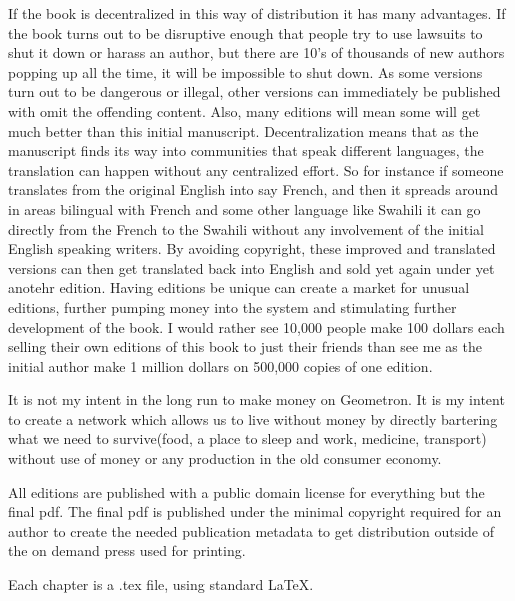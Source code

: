 If the book is decentralized in this way of distribution it has many advantages.  If the book turns out to be disruptive enough that people try to use lawsuits to shut it down or harass an author, but there are 10's of thousands of new authors popping up all the time, it will be impossible to shut down. As some versions turn out to be dangerous or illegal, other versions can immediately be published with omit the offending content. Also, many editions will mean some will get much better than this initial manuscript.  Decentralization means that as the manuscript finds its way into communities that speak different languages, the translation can happen without any centralized effort. So for instance if someone translates from the original English into say French, and then it spreads around in areas bilingual with French and some other language like Swahili it can go directly from the French to the Swahili without any involvement of the initial English speaking writers.  By avoiding copyright, these improved and translated versions can then get translated back into English and sold yet again under yet anotehr edition.  Having editions be unique can create a market for unusual editions, further pumping money into the system and stimulating further development of the book.  I would rather see 10,000 people make 100 dollars each selling their own editions of this book to just their friends than see me as the initial author make 1 million dollars on 500,000 copies of one edition.

It is not my intent in the long run to make money on Geometron. It is my intent to create a network which allows us to live without money by directly bartering what we need to survive(food, a place to sleep and work, medicine, transport) without use of money or any production in the old consumer economy.

All editions are published with a public domain license for everything but the final pdf.  The final pdf is published under the minimal copyright required for an author to create the needed publication metadata to get distribution outside of the on demand press used for printing.

Each chapter is a .tex file, using standard \LaTeX.

